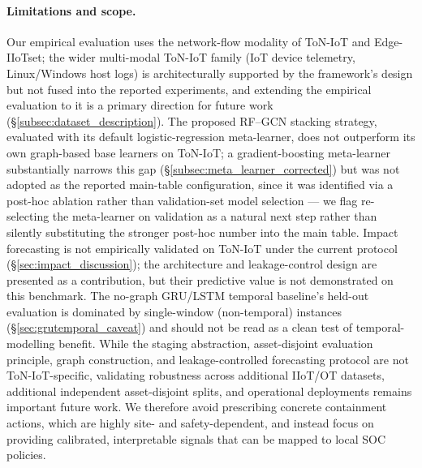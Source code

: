 \documentclass[pdflatex,sn-mathphys-num]{sn-jnl}
\theoremstyle{thmstyleone}%
\theoremstyle{thmstyletwo}%
\theoremstyle{thmstylethree}%
\begin{document}
\paragraph{Limitations and scope.}
Our empirical evaluation uses the network-flow modality of ToN-IoT and Edge-IIoTset; the wider multi-modal ToN-IoT family (IoT device telemetry, Linux/Windows host logs) is architecturally supported by the framework's design but not fused into the reported experiments, and extending the empirical evaluation to it is a primary direction for future work (\S\ref{subsec:dataset_description}). The proposed RF--GCN stacking strategy, evaluated with its default logistic-regression meta-learner, does not outperform its own graph-based base learners on ToN-IoT; a gradient-boosting meta-learner substantially narrows this gap (\S\ref{subsec:meta_learner_corrected}) but was not adopted as the reported main-table configuration, since it was identified via a post-hoc ablation rather than validation-set model selection --- we flag re-selecting the meta-learner on validation as a natural next step rather than silently substituting the stronger post-hoc number into the main table. Impact forecasting is not empirically validated on ToN-IoT under the current protocol (\S\ref{sec:impact_discussion}); the architecture and leakage-control design are presented as a contribution, but their predictive value is not demonstrated on this benchmark. The no-graph GRU/LSTM temporal baseline's held-out evaluation is dominated by single-window (non-temporal) instances (\S\ref{sec:grutemporal_caveat}) and should not be read as a clean test of temporal-modelling benefit. While the staging abstraction, asset-disjoint evaluation principle, graph construction, and leakage-controlled forecasting protocol are not ToN-IoT-specific, validating robustness across additional IIoT/OT datasets, additional independent asset-disjoint splits, and operational deployments remains important future work.
We therefore avoid prescribing concrete containment actions, which are highly site- and safety-dependent, and instead focus on providing calibrated, interpretable signals that can be mapped to local SOC policies.
\end{document}
